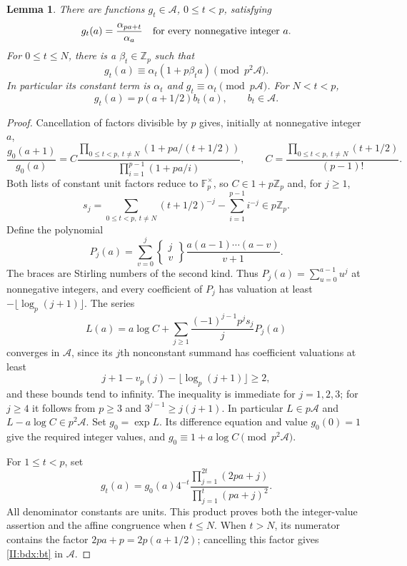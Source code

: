 \documentclass[11pt,letterpaper]{article}
\newtheorem{lemma}[theorem]{Lemma}
\theoremstyle{definition}
\theoremstyle{remark}
\begin{document}
\begin{lemma}\label{II:bdx:digits}
There are functions $g_t\in\mathcal A$, $0\le t<p$, satisfying
\[
 g_t(a)=\frac{\alpha_{pa+t}}{\alpha_a}
 \quad\hbox{for every nonnegative integer }a.
\]
For $0\le t\le N$, there is a $\beta_t\in\mathbb Z_p$ such that
\[
 g_t(a)\equiv\alpha_t(1+p\beta_t a)\pmod{p^2\mathcal A}.
\]
In particular its constant term is $\alpha_t$ and
$g_t\equiv\alpha_t\pmod{p\mathcal A}$. For $N<t<p$,
\begin{equation}\label{II:bdx:bt}
 g_t(a)=p(a+1/2)b_t(a),\qquad b_t\in\mathcal A.
\end{equation}
\end{lemma}
\begin{proof}
Cancellation of factors divisible by $p$ gives, initially at
nonnegative integer $a$,
\[
 \frac{g_0(a+1)}{g_0(a)}
 =C\frac{\prod_{0\le t<p,\ t\ne N}(1+pa/(t+1/2))}
             {\prod_{i=1}^{p-1}(1+pa/i)},\qquad
 C=\frac{\prod_{0\le t<p,\ t\ne N}(t+1/2)}{(p-1)!}.
\]
Both lists of constant unit factors reduce to
$\mathbb F_p^\times$, so $C\in1+p\mathbb Z_p$ and, for $j\ge1$,
\[
 s_j=\sum_{0\le t<p,\ t\ne N}(t+1/2)^{-j}
                         -\sum_{i=1}^{p-1}i^{-j}\in p\mathbb Z_p.
\]
Define the polynomial
\[
 P_j(a)=\sum_{v=0}^{j}
    \left\{\begin{matrix}j\\v\end{matrix}\right\}
     \frac{a(a-1)\cdots(a-v)}{v+1}.
\]
The braces are Stirling numbers of the second kind. Thus
$P_j(a)=\sum_{u=0}^{a-1}u^j$ at nonnegative integers, and every coefficient
of $P_j$ has valuation at least $-\lfloor\log_p(j+1)\rfloor$.
The series
\[
 L(a)=a\log C+
    \sum_{j\ge1}\frac{(-1)^{j-1}p^js_j}{j}P_j(a)
\]
converges in $\mathcal A$, since its $j$th nonconstant summand has
coefficient valuations at least
\[
 j+1-v_p(j)-\lfloor\log_p(j+1)\rfloor\ge2,
\]
and these bounds tend to infinity. The inequality is immediate for
$j=1,2,3$; for $j\ge4$ it follows from $p\ge3$ and
$3^{j-1}\ge j(j+1)$. In particular
$L\in p\mathcal A$ and $L-a\log C\in p^2\mathcal A$.
Set $g_0=\exp L$. Its difference equation and value $g_0(0)=1$
give the required integer values, and
$g_0\equiv1+a\log C\pmod{p^2\mathcal A}$.

For $1\le t<p$, set
\[
 g_t(a)=g_0(a)4^{-t}
     \frac{\prod_{j=1}^{2t}(2pa+j)}{\prod_{j=1}^{t}(pa+j)^2}.
\]
All denominator constants are units. This product proves both the
integer-value assertion and the affine congruence when $t\le N$.
When $t>N$, its numerator contains the factor
$2pa+p=2p(a+1/2)$; cancelling this factor gives
\eqref{II:bdx:bt} in $\mathcal A$.
\end{proof}
\end{document}
